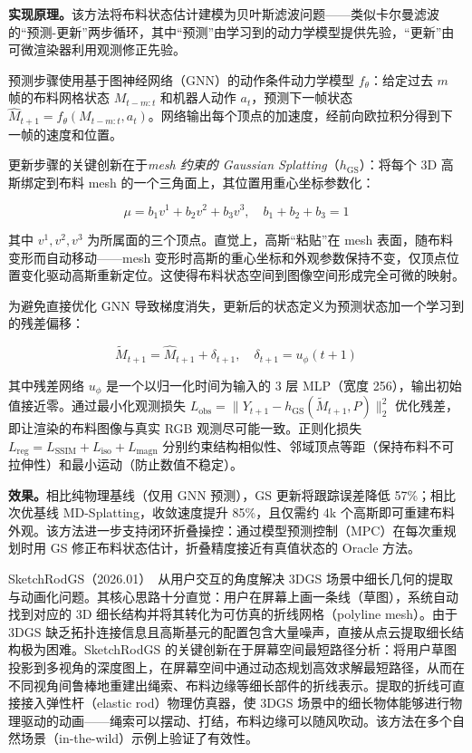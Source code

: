 \textbf{实现原理。}该方法将布料状态估计建模为贝叶斯滤波问题——类似卡尔曼滤波的``预测-更新''两步循环，其中``预测''由学习到的动力学模型提供先验，``更新''由可微渲染器利用观测修正先验。

预测步骤使用基于图神经网络（GNN）的动作条件动力学模型 $f_\theta$：给定过去 $m$ 帧的布料网格状态 $M_{t-m:t}$ 和机器人动作 $a_t$，预测下一帧状态 $\hat{M}_{t+1} = f_\theta(M_{t-m:t}, a_t)$。网络输出每个顶点的加速度，经前向欧拉积分得到下一帧的速度和位置。

更新步骤的关键创新在于\emph{mesh 约束的 Gaussian Splatting}（$h_{\text{GS}}$）：将每个 3D 高斯绑定到布料 mesh 的一个三角面上，其位置用重心坐标参数化：

\begin{equation}
  \mu = b_1 v^1 + b_2 v^2 + b_3 v^3, \quad b_1 + b_2 + b_3 = 1
\end{equation}

其中 $v^1, v^2, v^3$ 为所属面的三个顶点。直觉上，高斯``粘贴''在 mesh 表面，随布料变形而自动移动——mesh 变形时高斯的重心坐标和外观参数保持不变，仅顶点位置变化驱动高斯重新定位。这使得布料状态空间到图像空间形成完全可微的映射。

为避免直接优化 GNN 导致梯度消失，更新后的状态定义为预测状态加一个学习到的残差偏移：

\begin{equation}
  \tilde{M}_{t+1} = \hat{M}_{t+1} + \delta_{t+1}, \quad \delta_{t+1} = u_\phi(t+1)
\end{equation}

其中残差网络 $u_\phi$ 是一个以归一化时间为输入的 3 层 MLP（宽度 256），输出初始值接近零。通过最小化观测损失 $L_{\text{obs}} = \|Y_{t+1} - h_{\text{GS}}(\tilde{M}_{t+1}, P)\|_2^2$ 优化残差，即让渲染的布料图像与真实 RGB 观测尽可能一致。正则化损失 $L_{\text{reg}} = L_{\text{SSIM}} + L_{\text{iso}} + L_{\text{magn}}$ 分别约束结构相似性、邻域顶点等距（保持布料不可拉伸性）和最小运动（防止数值不稳定）。

\textbf{效果。}相比纯物理基线（仅用 GNN 预测），GS 更新将跟踪误差降低 57\%；相比次优基线 MD-Splatting，收敛速度提升 85\%，且仅需约 4k 个高斯即可重建布料外观。该方法进一步支持闭环折叠操控：通过模型预测控制（MPC）在每次重规划时用 GS 修正布料状态估计，折叠精度接近有真值状态的 Oracle 方法。

SketchRodGS（2026.01）~\cite{2601_02072}从用户交互的角度解决 3DGS 场景中细长几何的提取与动画化问题。其核心思路十分直觉：用户在屏幕上画一条线（草图），系统自动找到对应的 3D 细长结构并将其转化为可仿真的折线网格（polyline mesh）。由于 3DGS 缺乏拓扑连接信息且高斯基元的配置包含大量噪声，直接从点云提取细长结构极为困难。SketchRodGS 的关键创新在于屏幕空间最短路径分析：将用户草图投影到多视角的深度图上，在屏幕空间中通过动态规划高效求解最短路径，从而在不同视角间鲁棒地重建出绳索、布料边缘等细长部件的折线表示。提取的折线可直接接入弹性杆（elastic rod）物理仿真器，使 3DGS 场景中的细长物体能够进行物理驱动的动画——绳索可以摆动、打结，布料边缘可以随风吹动。该方法在多个自然场景（in-the-wild）示例上验证了有效性。

